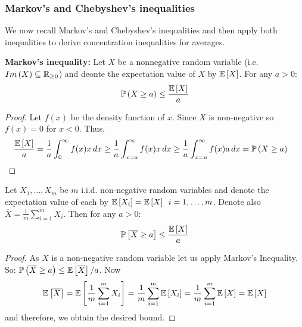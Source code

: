 \subsubsection{Markov's and Chebyshev's inequalities}
We now recall Markov's and Chebyshev's inequalities and then apply both inequalities to derive concentration inequalities for averages.
\begin{theorem} \textbf{Markov's inequality:} Let $X$ be a nonnegative random variable (i.e. $Im\left(X\right) \subseteq \mathbb{R} _{\ge 0}$) and deonte the expectation value of $X$ by $\mathbb{E}\left[X\right]$. For any $a>0$: $$ \mathbb{P} \left(X \geq a\right) \leq \frac{\mathbb{E}\left[X\right]}{a}$$
\end{theorem}
\begin{proof}
Let $f\left(x\right)$ be the density function of $x$. Since $X$ is non-negative so $f\left(x\right)=0$ for $x<0$. Thus,
\begin{align*}
	\frac{\mathbb{E}\left[X\right]}{a} &= \frac{1}{a}\int_{0} ^\infty f(x) x \,dx \ge \frac{1}{a}\int_{x =a} ^\infty f(x) x \,dx \ge \frac{1}{a}\int_{x =a} ^\infty f(x) a \, dx=\mathbb{P}\left(X \ge a\right)
\end{align*}
\end{proof}


\begin{corollary} \label{cor:markovAve}
Let $X_1,\ldots,X_m$ be $m$ i.i.d. non-negative random variables and denote the expectation value of each by  $\mathbb{E}\left[X_i\right]=\mathbb{E}\left[X\right]\,\,\, i = 1,\ldots,m$. Denote also  $\overline{X}=\frac{1}{m} \sum_{i=1} ^m X_i$. Then for any  $a>0$: $$ \mathbb{P} \left[\overline{X} \geq a\right] \leq \frac{\mathbb{E}\left[X \right]}{a}$$
\end{corollary}
\begin{proof}
As $\overline{X}$ is a non-negative random variable let us apply Markov's Inequality. So: $\mathbb{P} \left(\overline{X} \geq a\right) \leq \mathbb{E}\left[\overline{X}\right]/a$. Now 
\begin{align*}
	\mathbb{E}\left[\overline{X}\right] = \mathbb{E}\left[\frac{1}{m} \sum_{i=1} ^m X_i \right] 
		= \frac{1}{m} \sum_{i=1} ^m \mathbb{E}\left[X_i\right] 
		= \frac{1}{m} \sum_{i=1} ^m \mathbb{E}\left[X\right] 
		= \mathbb{E}\left[X\right]
\end{align*}
and therefore, we obtain the desired bound.
\end{proof}

